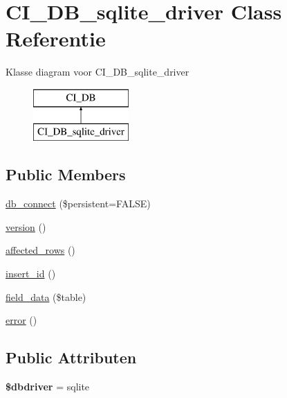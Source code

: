 \hypertarget{class_c_i___d_b__sqlite__driver}{}\section{C\+I\+\_\+\+D\+B\+\_\+sqlite\+\_\+driver Class Referentie}
\label{class_c_i___d_b__sqlite__driver}
Klasse diagram voor C\+I\+\_\+\+D\+B\+\_\+sqlite\+\_\+driver\begin{figure}[H]
\begin{center}
\leavevmode
\includegraphics[height=2.000000cm]{class_c_i___d_b__sqlite__driver}
\end{center}
\end{figure}
\subsection*{Public Members}
\begin{DoxyCompactItemize}
\item 
\mbox{\hyperlink{class_c_i___d_b__sqlite__driver_a52bf595e79e96cc0a7c907a9b45aeb4d}{db\+\_\+connect}} (\$persistent=F\+A\+L\+SE)
\item 
\mbox{\hyperlink{class_c_i___d_b__sqlite__driver_a6080dae0886626b9a4cedb29240708b1}{version}} ()
\item 
\mbox{\hyperlink{class_c_i___d_b__sqlite__driver_a77248aaad33eb132c04cc4aa3f4bc8cb}{affected\+\_\+rows}} ()
\item 
\mbox{\hyperlink{class_c_i___d_b__sqlite__driver_a933f2cde8dc7f87875e257d0a4902e99}{insert\+\_\+id}} ()
\item 
\mbox{\hyperlink{class_c_i___d_b__sqlite__driver_a90355121e1ed009e0efdbd544ab56efa}{field\+\_\+data}} (\$table)
\item 
\mbox{\hyperlink{class_c_i___d_b__sqlite__driver_a43b8d30b879d4f09ceb059b02af2bc02}{error}} ()
\end{DoxyCompactItemize}
\subsection*{Public Attributen}
\begin{DoxyCompactItemize}
\item 
\mbox{\label{class_c_i___d_b__sqlite__driver_a0cde2a16322a023d040aa7f725877597}} 
{\bfseries \$dbdriver} = \textquotesingle{}sqlite\textquotesingle{}
\end{DoxyCompactItemize}
